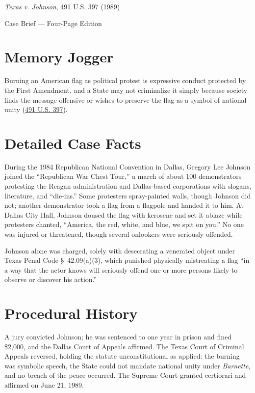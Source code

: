 \documentclass[12pt]{article}
\begin{document}
\begin{center}
{\LARGE \textit{Texas v. Johnson}, 491 U.S. 397 (1989)\par}
\vspace{0.8em}
{\large Case Brief --- Four-Page Edition\par}
\end{center}
\vspace{1em}

\section{Memory Jogger}

Burning an American flag as political protest is expressive conduct protected by the First Amendment, and a State may not criminalize it simply because society finds the message offensive or wishes to preserve the flag as a symbol of national unity (\href{https://www.courtlistener.com/opinion/112304/texas-v-johnson/}{491 U.S. 397}).

\section{Detailed Case Facts}

During the 1984 Republican National Convention in Dallas, Gregory Lee Johnson joined the ``Republican War Chest Tour,'' a march of about 100 demonstrators protesting the Reagan administration and Dallas-based corporations with slogans, literature, and ``die-ins.'' Some protesters spray-painted walls, though Johnson did not; another demonstrator took a flag from a flagpole and handed it to him. At Dallas City Hall, Johnson doused the flag with kerosene and set it ablaze while protesters chanted, ``America, the red, white, and blue, we spit on you.'' No one was injured or threatened, though several onlookers were seriously offended.

Johnson alone was charged, solely with desecrating a venerated object under Texas Penal Code \S~42.09(a)(3), which punished physically mistreating a flag ``in a way that the actor knows will seriously offend one or more persons likely to observe or discover his action.''

\section{Procedural History}

A jury convicted Johnson; he was sentenced to one year in prison and fined \$2,000, and the Dallas Court of Appeals affirmed. The Texas Court of Criminal Appeals reversed, holding the statute unconstitutional as applied: the burning was symbolic speech, the State could not mandate national unity under \textit{Barnette}, and no breach of the peace occurred. The Supreme Court granted certiorari and affirmed on June 21, 1989.
\end{document}
